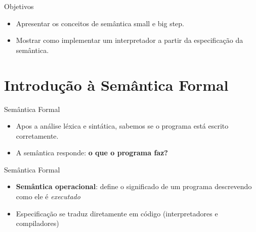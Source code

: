 \subtitle{\bf Aula 12 - Introdução}
\begin{frame}[t,plain]
    \titlepage
\end{frame}

\begin{frame}{Objetivos}

    \begin{itemize}
        \item
        Apresentar os conceitos de semântica small e big step.
        \item
        Mostrar como implementar um interpretador a partir da especificação da
        semântica.
    \end{itemize}
\end{frame}


\section{Introdução à Semântica
Formal}\label{introduuxe7uxe3o-uxe0-semuxe2ntica-formal}

\begin{frame}{Semântica Formal}

    \begin{itemize}

        \item
        Apos a análise léxica e sintática, sabemos se o programa está escrito
        corretamente.
        \item
        A semântica responde: \textbf{o que o programa faz?}
    \end{itemize}
\end{frame}

\begin{frame}{Semântica Formal}

    \begin{itemize}

        \item
        \textbf{Semântica operacional}: define o significado de um programa
        descrevendo como ele é \emph{executado}
        \item
        Especificação se traduz diretamente em código (interpretadores e
        compiladores)
    \end{itemize}
\end{frame}

